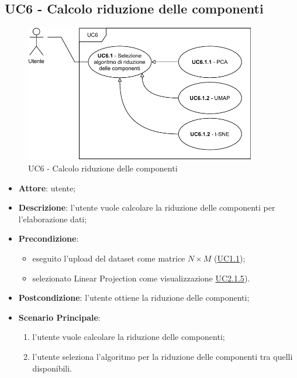 \subsection{UC6 - Calcolo riduzione delle componenti}
    \label{uc6}
    
    \begin{figure}[htbp]
        \centering
        \includegraphics[width=0.9\textwidth]{source/sections/casi-uso/diagrams/uc6.pdf}
        \caption{UC6 - Calcolo riduzione delle componenti}
        \label{fig:uc6}
    \end{figure}
    
    \begin{itemize}
    \item \textbf{Attore}: utente;
    \item \textbf{Descrizione}: l'utente vuole calcolare la riduzione delle componenti per l'elaborazione dati;
    \item \textbf{Precondizione}: 
    \begin{itemize}
        \item eseguito l'upload del dataset come matrice $N\times M$ (\hyperref[uc1.1]{UC1.1});
        \item selezionato Linear Projection come visualizzazione \hyperref[uc2.1.5]{UC2.1.5}).
    \end{itemize}  
    \item \textbf{Postcondizione}: l'utente ottiene la riduzione delle componenti;
    \item \textbf{Scenario Principale}: 
    \begin{enumerate}
        \item l'utente vuole calcolare la riduzione delle componenti;
        \item l'utente seleziona l'algoritmo per la riduzione delle componenti tra quelli disponibili.
    \end{enumerate}
    \end{itemize}
    
